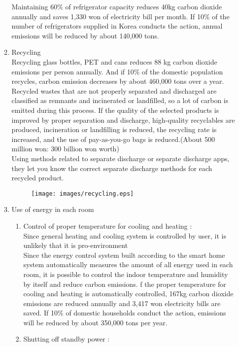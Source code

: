\documentclass[11pt, conference]{IEEEtran}
\begin{document}
\begin{enumerate}[label=\arabic*]
\begin{enumerate}[label=\alph*]
        Maintaining 60\% of refrigerator capacity reduces 40kg carbon dioxide annually and saves 1,330 won of electricity bill per month. If 10\% of the number of refrigerators supplied in Korea conducts the action, annual emissions will be reduced by about 140,000 tons.
        \item Recycling\\
        Recycling glass bottles, PET and cans reduces 88 kg carbon dioxide emissions per person annually. And if 10\% of the domestic population recycles, carbon emission decreases by about 460,000 tons over a year.\\
        Recycled wastes that are not properly separated and discharged are classified as remnants and incinerated or landfilled, so a lot of carbon is emitted during this process. If the quality of the selected products is improved by proper separation and discharge, high-quality recyclables are produced, incineration or landfilling is reduced, the recycling rate is increased, and the use of pay-as-you-go bags is reduced.(About 500 million won: 300 billion won worth)\\
        Using methods related to separate discharge or separate discharge apps, they let you know the correct separate discharge methods for each recycled product.
        \begin{figure}[H]
            \centering
            \texttt{[image: images/recycling.eps]}
        \end{figure}
        \item Use of energy in each room
        \begin{enumerate}[label=\roman]
            \item Control of proper temperature for cooling and heating : \\
            Since general heating and cooling system is controlled by user, it is unlikely that it is pro-environment\\
            Since the energy control system built according to the smart home system automatically measures the amount of all energy used in each room, it is possible to control the indoor temperature and humidity by itself and reduce carbon emissions.
            f the proper temperature for cooling and heating is automatically controlled, 167kg carbon dioxide emissions are reduced annually and 3,417 won electricity bills are saved. If 10\% of domestic households conduct the action, emissions will be reduced by about 350,000 tons per year.
            \item Shutting off standby power : \\

\end{enumerate}
\end{enumerate}
\end{enumerate}
\end{document}
